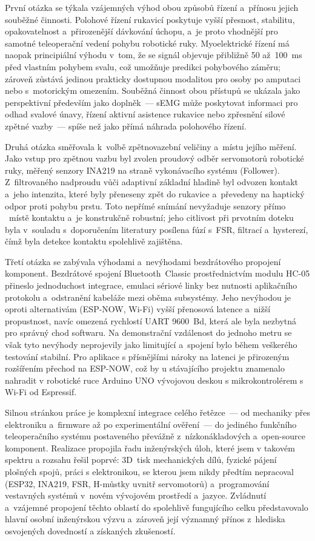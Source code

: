 \documentclass[FZS,DP]{tulthesis}
\begin{document}
První otázka se týkala vzájemných výhod obou způsobů řízení a~přínosu jejich souběžné činnosti. Polohové řízení rukavicí poskytuje vyšší přesnost, stabilitu, opakovatelnost a~přirozenější dávkování úchopu, a~je proto vhodnější pro samotné teleoperační vedení pohybu robotické ruky. Myoelektrické řízení má naopak principiální výhodu v~tom, že se signál objevuje přibližně 50 až~100~ms před vlastním pohybem svalu, což umožňuje predikci pohybového záměru; zároveň zůstává jedinou prakticky dostupnou modalitou pro osoby po amputaci nebo s~motorickým
omezením. Souběžná činnost obou přístupů se ukázala jako perspektivní především jako doplněk~--- sEMG může poskytovat informaci pro odhad svalové únavy, řízení aktivní asistence rukavice nebo zpřesnění silové zpětné vazby~--- spíše než jako přímá náhrada polohového řízení.

Druhá otázka směřovala k~volbě zpětnovazební veličiny a~místu jejího měření. Jako vstup pro zpětnou vazbu byl zvolen proudový odběr servomotorů robotické ruky, měřený senzory INA219 na straně vykonávacího systému (Follower). Z~filtrovaného nadproudu vůči adaptivní základní hladině byl odvozen kontakt a~jeho intenzita, které byly přeneseny zpět do rukavice a~převedeny na haptický odpor proti pohybu prstu. Toto nepřímé snímání nevyžaduje senzory přímo   ~místě
kontaktu a~je konstrukčně robustní; jeho citlivost při prvotním doteku byla v~souladu s~doporučením literatury posílena fúzí s~FSR, filtrací a~hysterezí, čímž byla detekce kontaktu spolehlivě zajištěna.

Třetí otázka se zabývala výhodami a~nevýhodami bezdrátového propojení komponent. Bezdrátové spojení Bluetooth~Classic prostřednictvím modulu HC-05 přineslo jednoduchost integrace, emulaci sériové linky bez nutnosti aplikačního protokolu a~odstranění kabeláže mezi oběma subsystémy. Jeho nevýhodou je oproti alternativám (ESP-NOW, Wi-Fi) vyšší přenosová latence a~nižší propustnost, navíc omezená rychlostí UART 9600~Bd, která ale byla nezbytná pro správný chod softwaru. Na demonstrační vzdálenost do jednoho metru se však tyto nevýhody neprojevily jako limitující a~spojení bylo během veškerého testování stabilní. Pro aplikace s přísnějšími nároky na latenci je přirozeným rozšířením přechod na ESP-NOW, což by u stávajícího projektu znamenalo nahradit v robotické ruce Arduino UNO vývojovou deskou s mikrokontrolérem s Wi-Fi od Espressif.

Silnou stránkou práce je komplexní integrace celého řetězce~--- od mechaniky přes elektroniku a~firmware až po experimentální ověření~--- do jediného funkčního teleoperačního systému postaveného převážně z~nízkonákladových a~open-source komponent. Realizace propojila řadu inženýrských úloh, které jsem v takovém spektru a rozsahu řešil poprvé: 3D~tisk mechanických dílů, fyzické pájení plošných spojů, práci s elektronikou, se kterou jsem nikdy předtím nepracoval (ESP32, INA219, FSR, H-můstky uvnitř servomotorů) a~programování vestavných systémů v~novém vývojovém prostředí a~jazyce. Zvládnutí a~vzájemné propojení těchto oblastí do spolehlivě fungujícího celku představovalo hlavní osobní inženýrskou výzvu a~zároveň její významný přínos z~hlediska osvojených dovedností a získaných zkušeností.
\end{document}
